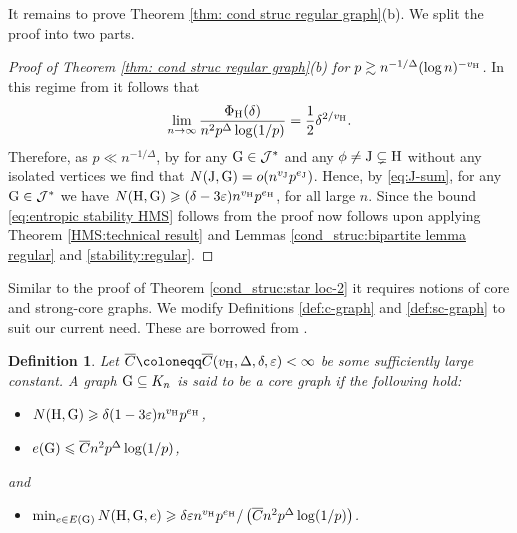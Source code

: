 \documentclass[a4paper,11pt,english,reqno]{amsart}
\numberwithin{equation}{section}
\renewcommand{\leq}{\leqslant}
\renewcommand{\geq}{\geqslant}
\newcommand{\cbar}{\overline{C}}
\newcommand{\uH}{\textup{H}}
\newcommand{\tu}[1]{\textup{#1}}
\newtheorem{definition}[theorem]{Definition}
\begin{document}
It remains to prove Theorem \ref{thm: cond struc regular graph}(b). We split the proof into two parts.
\begin{proof}[Proof of Theorem \ref{thm: cond struc regular graph}(b) for $p \gtrsim n^{-1/\Delta} (\log n)^{-v_{\uH}}$] In this regime from \cite{BGLZ} it follows that 
\[
\lim_{n \to \infty} \frac{\Phi_{\uH}(\delta)}{n^2 p^\Delta \log(1/p)}=\frac12 \delta^{2/v_{\uH}}.
\]
Therefore, as $p \ll n^{-1/\Delta}$, by \cite[Lemma 5.2 and Theorem 5.4]{HMS} for any $\tu{G} \in \mathcal{J}^*$ and any $\phi \neq \tu{J} \subsetneq \uH$ without any isolated vertices we find that $N(\tu{J}, \tu{G}) = o(n^{v_{\tu{J}}} p^{e_{\tu{J}}})$. Hence, by \eqref{eq:J-sum}, for any $\tu{G} \in \mathcal{J}^*$ we have $N(\uH, \tu{G}) \geq (\delta -3 \varepsilon) n^{v_{\uH}} p^{e_{\uH}}$, for all large $n$. Since the bound \eqref{eq:entropic stability HMS} follows from \cite[Proposition 7.1]{HMS} the proof now follows upon applying Theorem \ref{HMS:technical result} and Lemmas \ref{cond_struc:bipartite lemma regular} and \ref{stability:regular}.
\end{proof}



Similar to the proof of Theorem \ref{cond_struc:star loc-2} it requires notions of core and strong-core graphs. We modify Definitions \ref{def:c-graph} and \ref{def:sc-graph} to suit our current need. These are borrowed from \cite{ABRB}.


\begin{definition}
Let $\overline C \coloneqq \overline C(v_{\uH}, \Delta, \delta, \varepsilon) < \infty$ be some sufficiently large constant.		A graph $\tu{G}\subseteq K_n$ is said to be a core graph if the following hold:
\begin{itemize}
	\item[(C1)]%
	$N(\uH, \tu{G})\geq \delta(1-3\varepsilon)n^{v_{\uH}}p^{e_{\uH}}$,
	\item[(C2)] %
	$e(\tu{G})\leq \cbar n^{2}p^\Delta \log(1/p)$, 
\end{itemize}
and 
\begin{itemize}
	\item[(C3)] $\min_{e\in E(\tu{G})}N(\uH, \tu{G},e)\geq \delta \varepsilon n^{v_{\uH}}p^{e_{\uH}}/ \left(\cbar n^{2}p^\Delta \log(1/p)\right)$.
\end{itemize}
\end{definition}
\end{document}
